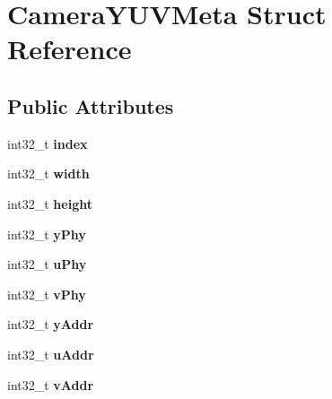 \hypertarget{struct_camera_y_u_v_meta}{}\section{Camera\+Y\+U\+V\+Meta Struct Reference}
\label{struct_camera_y_u_v_meta}
\subsection*{Public Attributes}
\begin{DoxyCompactItemize}
\item 
\mbox{\label{struct_camera_y_u_v_meta_ab0b52576732233d075a31ee605e123cb}} 
int32\+\_\+t {\bfseries index}
\item 
\mbox{\label{struct_camera_y_u_v_meta_a6eed10a3e9373153d0d70ab82e43923a}} 
int32\+\_\+t {\bfseries width}
\item 
\mbox{\label{struct_camera_y_u_v_meta_a5e5614e47f4c56e930ed38566416e221}} 
int32\+\_\+t {\bfseries height}
\item 
\mbox{\label{struct_camera_y_u_v_meta_ad9c898a768b3e9668b69f9f753403ae0}} 
int32\+\_\+t {\bfseries y\+Phy}
\item 
\mbox{\label{struct_camera_y_u_v_meta_a9eb8d4d69d2021e285cae1f832464eb3}} 
int32\+\_\+t {\bfseries u\+Phy}
\item 
\mbox{\label{struct_camera_y_u_v_meta_abe6dd3f0bcc5adb38376bcf865be3f5c}} 
int32\+\_\+t {\bfseries v\+Phy}
\item 
\mbox{\label{struct_camera_y_u_v_meta_a8de86c13fd4d388d26c61694b813a623}} 
int32\+\_\+t {\bfseries y\+Addr}
\item 
\mbox{\label{struct_camera_y_u_v_meta_a8cb753f9cc13f28fda7e294264327d54}} 
int32\+\_\+t {\bfseries u\+Addr}
\item 
\mbox{\label{struct_camera_y_u_v_meta_aa827d830ac49c79ed6573692e421a351}} 
int32\+\_\+t {\bfseries v\+Addr}

\end{DoxyCompactItemize}
